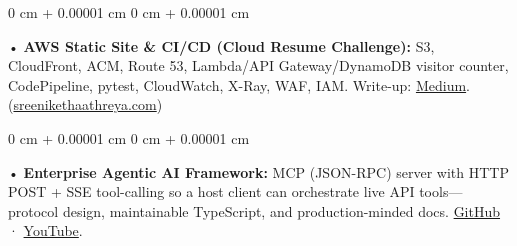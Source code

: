 \documentclass[10pt, letterpaper]{article}
\newenvironment{onecolentry}{
    \begin{adjustwidth}{
        0 cm + 0.00001 cm
    }{
        0 cm + 0.00001 cm
    }
}{
    \end{adjustwidth}
} %
\begin{document}
\begin{onecolentry}
     • \textbf{AWS Static Site \& CI/CD (Cloud Resume Challenge):} S3, CloudFront, ACM, Route 53, Lambda/API Gateway/DynamoDB visitor counter, CodePipeline, pytest, CloudWatch, X-Ray, WAF, IAM. Write-up: \href{https://medium.com/@sreenikethaathreya/cloud-resume-challenge-c4f17c3d53ff}{Medium}. (\href{https://sreenikethaathreya.com}{sreenikethaathreya.com})
\end{onecolentry}
\begin{onecolentry}
     • \textbf{Enterprise Agentic AI Framework:} MCP (JSON-RPC) server with HTTP POST + SSE tool-calling so a host client can orchestrate live API tools---protocol design, maintainable TypeScript, and production-minded docs. \href{https://github.com/daedalus-s/dota2-mcp-server}{GitHub} · \href{https://www.youtube.com/watch?v=op2gTYyFb5U}{YouTube}.
\end{onecolentry}
\vspace{2 pt }
        \vspace{2 pt }
\end{document}

